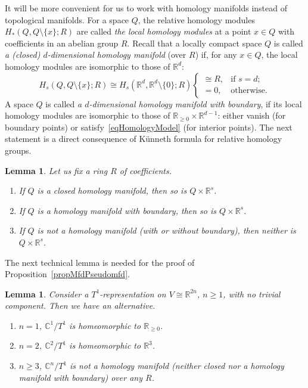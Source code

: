 \documentclass[english,12pt,oneside]{amsproc}
\newcommand{\Ro}{\mathbb{R}}
\newcommand{\Rg}{\mathbb{R}_{\geqslant 0}}
\newcommand{\Co}{\mathbb{C}}
\newcounter{stmcounter}[section]
\numberwithin{equation}{section}
\theoremstyle{plain}
\newtheorem{lem}[stmcounter]{Lemma}
\theoremstyle{definition}
\theoremstyle{remark}
\begin{document}
It will be more convenient for us to work with homology manifolds instead of topological manifolds. For a space $Q$, the relative homology modules $H_*(Q,Q\setminus\{x\};R)$ are called \emph{the local homology modules} at a point $x\in Q$ with coefficients in an abelian group $R$. Recall that a locally compact space $Q$ is called \emph{a (closed) $d$-dimensional homology manifold} (over $R$) if, for any $x\in Q$, the local homology modules are isomorphic to those of $\Ro^d$:
\begin{equation}\label{eqHomologyModel}
H_s(Q,Q\setminus\{x\};R)\cong H_s(\Ro^d,\Ro^d\setminus\{0\};R)\begin{cases}
                                                                \cong R, & \mbox{if } s=d; \\
                                                                =0, & \mbox{otherwise}.
                                                              \end{cases}
\end{equation}
A space $Q$ is called \emph{a $d$-dimensional homology manifold with boundary}, if its local homology modules are isomorphic to those of $\Rg\times\Ro^{d-1}$: either vanish (for boundary points) or satisfy~\eqref{eqHomologyModel} (for interior points). The next statement is a direct consequence of K\"{u}nneth formula for relative homology groups.

\begin{lem}\label{lemHomMfd}
Let us fix a ring $R$ of coefficients.
\begin{enumerate}
  \item If $Q$ is a closed homology manifold, then so is $Q\times\Ro^s$.
  \item If $Q$ is a homology manifold with boundary, then so is $Q\times\Ro^s$.
  \item If $Q$ is not a homology manifold (with or without boundary), then neither is $Q\times\Ro^s$.
\end{enumerate}
\end{lem}

The next technical lemma is needed for the proof of Proposition~\ref{propMfdPseudomfd}.

\begin{lem}\label{lemCircle}
Consider a $T^1$-representation on $V\cong\Ro^{2n}$, $n\geqslant 1$, with no trivial component. Then we have an alternative.
\begin{enumerate}
  \item $n=1$, $\Co^1/T^1$ is homeomorphic to $\Rg$.
  \item $n=2$, $\Co^2/T^1$ is homeomorphic to $\Ro^3$.
  \item $n\geqslant 3$, $\Co^n/T^1$ is not a homology manifold (neither closed nor a homology manifold with boundary) over any $R$.
\end{enumerate}
\end{lem}
\end{document}
